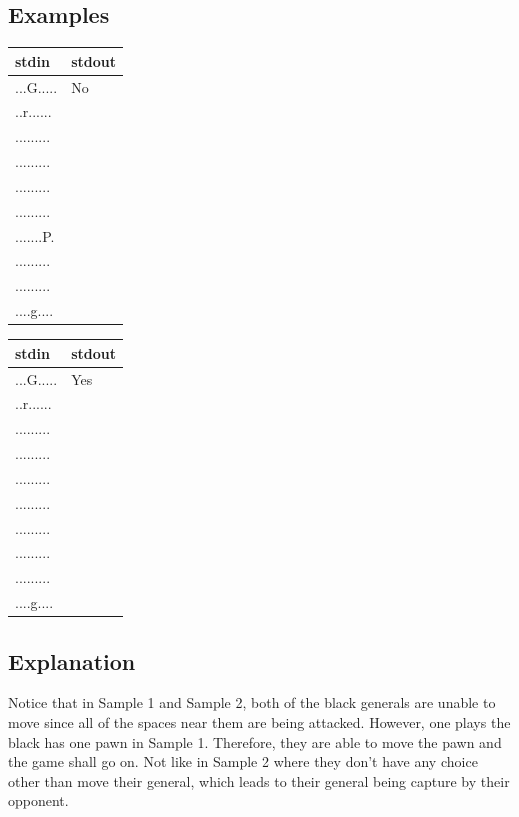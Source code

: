 \documentclass[12pt,a4paper]{article}
\begin{document}
\subsection*{\fontsize{16}{12}Examples}
\begin{table}[h]
  \centering
  \begin{tabularx}{\textwidth}{|>{\ttfamily}X|>{\ttfamily}X|}
  \hline
  stdin & stdout\\
  \hline
    ...G.....&No\\
    ..r......&\\
    .........&\\
    .........&\\
    .........&\\
    .........&\\
    .......P.&\\
    .........&\\
    .........&\\
    ....g....&\\
  \hline
 \end{tabularx}
\end{table}

\begin{table}[h]
  \centering
  \begin{tabularx}{\textwidth}{|>{\ttfamily}X|>{\ttfamily}X|}
  \hline
  stdin & stdout\\
  \hline
    ...G.....&Yes\\
    ..r......&\\
    .........&\\
    .........&\\
    .........&\\
    .........&\\
    .........&\\
    .........&\\
    .........&\\
    ....g....&\\
  \hline
 \end{tabularx}
\end{table}

\subsection*{\fontsize{16}{12}Explanation}
Notice that in Sample 1 and Sample 2, both of the black generals are unable to move since all of the spaces near them are being attacked. However, one plays the black has one pawn in Sample 1. Therefore, they are able to move the pawn and the game shall go on. Not like in Sample 2 where they don't have any choice other than move their general, which leads to their general being capture by their opponent.
\end{document}
